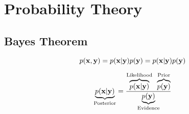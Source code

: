 \chapter{Probability Theory}

\section{Bayes Theorem}

\begin{equation}
  p(\mathbf{x}, \mathbf{y}) = p(\mathbf{x}|\mathbf{y}) p(\mathbf{y}) = p(\mathbf{x}|\mathbf{y}) p(\mathbf{y})
\end{equation}

\begin{equation}
  \underbrace{p(\mathbf{x}|\mathbf{y})}_{\text{Posterior}} =
    \dfrac{
      \overbrace{p(\mathbf{x}|\mathbf{y})}^{\text{Likelihood}}
      \enspace
      \overbrace{p(\mathbf{y})}^{\text{Prior}}
    }{
      \underbrace{p(\mathbf{y})}_{\text{Evidence}}
    }
\end{equation}
